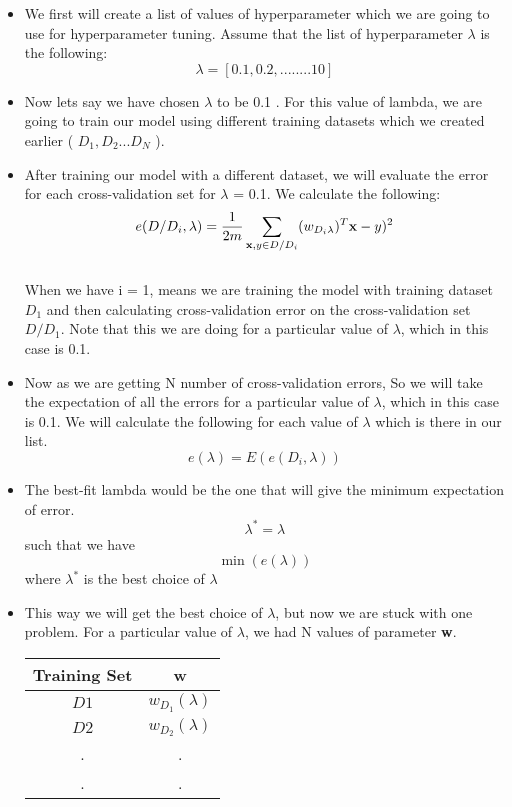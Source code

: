\documentclass[10pt]{article}
\begin{document}
\begin{itemize}
    \item We first will create a list of values of hyperparameter which we are going to use for hyperparameter tuning. Assume that the list of hyperparameter $\lambda$ is the following: \\
            $$\lambda = [0.1,0.2,........10]$$
    \item Now lets say we have chosen $\lambda$ to be 0.1 . For this value of lambda, we are going to train our model using different training datasets which we created earlier ( $D_1, D_2 ... D_N$ ).
    \item After training our model with a different dataset, we will evaluate the error for each cross-validation set for $\lambda$ = 0.1. We calculate the following:
        $$ e(D/D_i,\lambda) = \frac{1}{2m} \sum\limits_{  \textbf{x},y \in D/D_i \notag} (w_{D_i\lambda})^T \textbf{x} - y)^2 $$ \\ 
    When we have i = 1, means we are training the model with training dataset $D_1$ and then calculating cross-validation error on the cross-validation set $D/D_1$. Note that this we are doing for a particular value of $\lambda$, which in this case is 0.1.
    \item Now as we are getting N number of cross-validation errors, So we will take the expectation of all the errors for a particular value of $\lambda$, which in this case is 0.1. We will calculate the following for each value of $\lambda$ which is there in our list.
        $$ e(\lambda) = E(e(D_i,\lambda)) $$
    \item The best-fit lambda would be the one that will give the minimum expectation of error. 
        $$ \lambda^* = \lambda $$  
        such that we have
            $$ \min(e(\lambda))$$
        where $\lambda^*$ is the best choice of $\lambda$
    \item This way we will get the best choice of $\lambda$, but now we are stuck with one problem. For a particular value of $\lambda$, we had N values of parameter \textbf{w}. \\
        \begin{table}[ht]
\centering
\begin{tabular}{|c|c|}
\hline
\textbf{Training Set} & \textbf{w} \\ [0.5ex]
\hline
$D1$ & $w_{D_1}(\lambda)$\\
\hline
$D2$ & $w_{D_2}(\lambda)$\\
\hline
 . & .\\
 . & .\\

\end{tabular}
\end{table}
\end{itemize}
\end{document}
